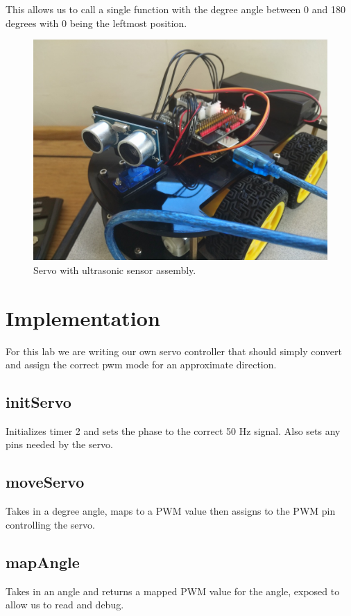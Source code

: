 \documentclass[letterpaper,11pt]{texMemo} %
\begin{document}
This allows us to call a single function with the degree angle between 0 and 180 degrees with 0
being the leftmost position.

\begin{figure}[!ht]
\begin{center}
\includegraphics[width=\linewidth]{robot.jpg}
\end{center}
\caption{Servo with ultrasonic sensor assembly.}
\label{fig:f4}
\end{figure}

\section*{Implementation}
For this lab we are writing our own servo controller that should simply 
convert and assign the correct pwm mode for an approximate direction.

\subsection*{initServo}
Initializes timer 2 and sets the phase to the correct 50 Hz signal. 
Also sets any pins needed by the servo.

\subsection*{moveServo}
Takes in a degree angle, maps to a PWM value then assigns to the PWM 
pin controlling the servo.

\subsection*{mapAngle}
Takes in an angle and returns a mapped PWM value for the angle, exposed 
to allow us to read and debug.
\end{document}
